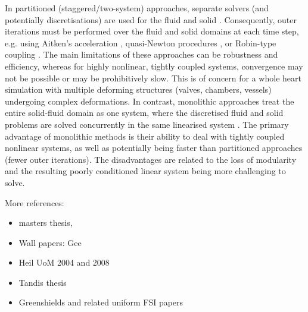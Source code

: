 \documentclass[sn-mathphys,Numbered]{sn-jnl}%
\begin{document}
In partitioned (staggered/two-system) approaches, separate solvers (and potentially discretisations) are used for the fluid and solid \citep{tukovic2018openfoam}. Consequently, outer iterations must be performed over the fluid and solid domains at each time step, e.g. using Aitken’s acceleration \citep{degroote2009performance, bungartz2016precice, irons1969version, kuttler2008fixed}, quasi-Newton procedures \citep{santiago2020hpc, delaisse2022surrogate}, or Robin-type coupling \citep{tukovic2019added}. The main limitations of these approaches can be robustness and efficiency, whereas for highly nonlinear, tightly coupled systems, convergence may not be possible or may be prohibitively slow. This is of concern for a whole heart simulation with multiple deforming structures (valves, chambers, vessels) undergoing complex deformations. In contrast, monolithic approaches treat the entire solid-fluid domain as one system, where the discretised fluid and solid problems are solved concurrently in the same linearised system \citep{degroote2009performance}. The primary advantage of monolithic methods is their ability to deal with tightly coupled nonlinear systems, as well as potentially being faster than partitioned approaches (fewer outer iterations). The disadvantages are related to the loss of modularity and the resulting poorly conditioned linear system being more challenging to solve.

More references:
\begin{itemize}
	\item \citet{Gjertsen2017} masters thesis, \citep{Sebastian-Gjertsen-turtleFSI}
	\item Wall papers: Gee
	\item Heil UoM 2004 and 2008
	\item Tandis thesis
	\item Greenshields and related uniform FSI papers
\end{itemize}


\end{document}
